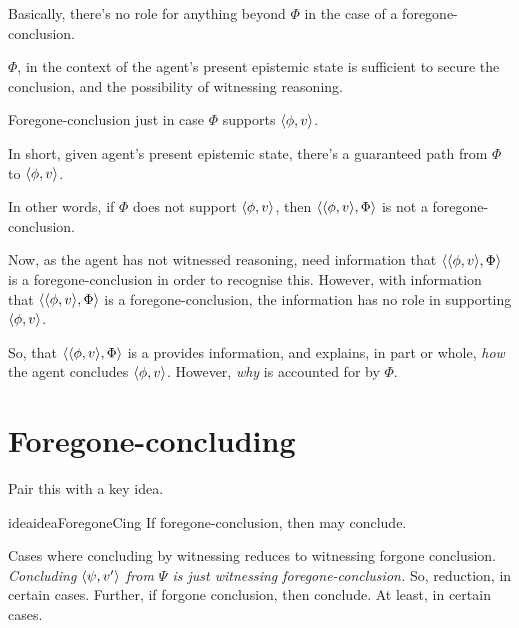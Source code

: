 \begin{note}[Trimming]
  \begin{proposition}
    Basically, there's no role for anything beyond \(\Phi\) in the case of a foregone-conclusion.

    \(\Phi\), in the context of the agent's present epistemic state is sufficient to secure the conclusion, and the possibility of witnessing reasoning.
  \end{proposition}

  \begin{proposition}
    Foregone-conclusion just in case \(\Phi\) supports \(\langle \phi, v \rangle\).
    \begin{argument}
      In short, given agent's present epistemic state, there's a guaranteed path from \(\Phi\) to \(\langle \phi, v \rangle\).
    \end{argument}
    In other words, if \(\Phi\) does not support \(\langle \phi, v \rangle\), then \(\langle \langle \phi, v \rangle, \Phi \rangle\) is not a foregone-conclusion.
  \end{proposition}

  Now, as the agent has not witnessed reasoning, need information that \(\langle \langle \phi, v \rangle, \Phi \rangle\) is a foregone-conclusion in order to recognise this.
  However, with information that \(\langle \langle \phi, v \rangle, \Phi \rangle\) is a foregone-conclusion, the information has no role in supporting \(\langle \phi, v \rangle\).
\end{note}

\begin{note}
  So, that \(\langle \langle \phi, v \rangle, \Phi \rangle\) is a  provides information, and explains, in part or whole, \emph{how} the agent concludes \(\langle \phi, v \rangle\).
  However, \emph{why} is accounted for by \(\Phi\).
\end{note}

\section{Foregone-concluding}

\begin{note}
  Pair this with a key idea.

  \begin{restatable}{idea}{ideaForegoneCing}
    \label{idea:reassignment}
    If foregone-conclusion, then may conclude.
  \end{restatable}

  Cases where concluding by witnessing reduces to witnessing forgone conclusion.
  \emph{Concluding \(\langle \psi, v' \rangle\) from \(\Psi\) is just witnessing foregone-conclusion.}
  So, reduction, in certain cases.
  Further, if forgone conclusion, then conclude.
  At least, in certain cases.
\end{note}

